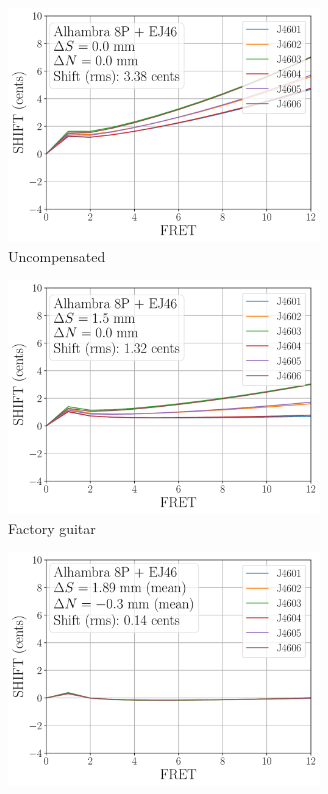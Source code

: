  \begin{figure}
  \centering
  \begin{subfigure}[b]{0.45\textwidth}
   \centering
   \includegraphics[width=3.25in]{../figures/shift_alhambra8p_ej46_null}
   \caption{Uncompensated}
   \label{fig:shift_alhambra8p_ej46_null}
  \end{subfigure}
  \hspace{0.25in}
  \begin{subfigure}[b]{0.45\textwidth}
   \centering
   \includegraphics[width=3.25in]{../figures/shift_alhambra8p_ej46_factory}
   \caption{Factory guitar}
   \label{fig:shift_alhambra8p_ej46_factory}
  \end{subfigure}
  \par\vspace{0.25in}
  \begin{subfigure}[b]{0.45\textwidth}
   \centering
   \includegraphics[width=3.25in]{../figures/shift_alhambra8p_ej46_full}

\end{subfigure}
\end{figure}

